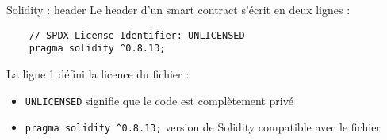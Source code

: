 \begin{frame}[fragile]{Solidity : header}
  Le header d'un smart contract s'écrit en deux lignes :

  \begin{verbatim}
    // SPDX-License-Identifier: UNLICENSED
    pragma solidity ^0.8.13;
  \end{verbatim}

  La ligne 1 défini la licence du fichier :

  \begin{itemize}
    \item \texttt{UNLICENSED} signifie que le code est complètement privé
    \item \texttt{pragma solidity ^0.8.13;} version de Solidity compatible avec le fichier
  \end{itemize}
\end{frame}

